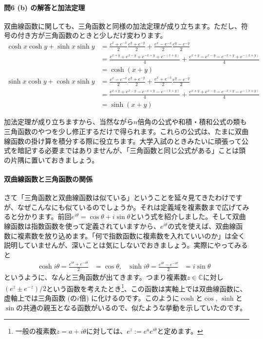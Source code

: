 \paragraph{問6 (b) の解答と加法定理}
双曲線函数に関しても、三角函数と同様の加法定理が成り立ちます。ただし、符号の付き方が三角函数のときと少しだけ変わります。
\begin{align*}
\cosh x \cosh y + \sinh x \sinh y
&= \frac{e^x + e^{-x}}{2} \frac{e^y + e^{-y}}{2} + \frac{e^x - e^{-x}}{2}\frac{e^y - e^{-y}}{2} \\
&= \frac{e^{x+y} + e^{x-y} + e^{-x+y} + e^{-(x+y)}}{4} + \frac{e^{x+y} - e^{x-y} - e^{-x+y} + e^{-(x+y)}}{4} \\
&= \cosh(x+y) \\
\sinh x \cosh y + \cosh x \sinh y
&= \frac{e^x - e^{-x}}{2} \frac{e^y + e^{-y}}{2} + \frac{e^x + e^{-x}}{2}\frac{e^y - e^{-y}}{2} \\
&= \frac{e^{x+y} + e^{x-y} - e^{-x+y} - e^{-(x+y)}}{4} + \frac{e^{x+y} + e^{x-y} - e^{-x+y} - e^{-(x+y)}}{4} \\
&= \sinh(x+y)
\end{align*}

加法定理が成り立ちますから、当然ながら$n$倍角の公式や和積・積和公式の類も三角函数のやつを少し修正するだけで得られます。これらの公式は、たまに双曲線函数の掛け算を積分する際に役立ちます。大学入試のときみたいに頑張って公式を暗記する必要まではありませんが、「三角函数と同じ公式がある」ことは頭の片隅に置いておきましょう。

\paragraph{双曲線函数と三角函数の関係}

さて「三角函数と双曲線函数は似ている」ということを延々見てきたわけですが、なぜこんなにも似ているのでしょうか。それは定義域を複素数まで広げてみると分かります。前回$e^{i\theta} = \cos\theta + i \sin \theta$という式を紹介しました。そして双曲線函数は指数函数を使って定義されていますから、$e^{i\theta}$の式を使えば、双曲線函数に複素数を放り込めます。「何で指数函数に複素数を入れていいのか」は全く説明していませんが、深いことは気にしないでおきましょう。実際にやってみると
\begin{align*}
\cosh i\theta = \frac{e^{i\theta} + e^{-i\theta}}{2} &= \cos \theta, &
\sinh i\theta = \frac{e^{i\theta} - e^{-i\theta}}{2} &= i\sin \theta &
\end{align*}
というように、なんと三角函数が出てきます。つまり複素数$z\in\mathbb{C}$に対し$(e^z \pm e^{-z})/2$という函数を考えたとき\footnote{一般の複素数$z=a+i\theta$に対しては、$e^z := e^a e^{i\theta}$と定めます。}、この函数は実軸上では双曲線函数に、虚軸上では三角函数 (の$i$倍) に化けるのです。このように$\cosh$と$\cos$, $\sinh$と$\sin$の共通の親玉となる函数がいるので、似たような挙動を示していたのです。

